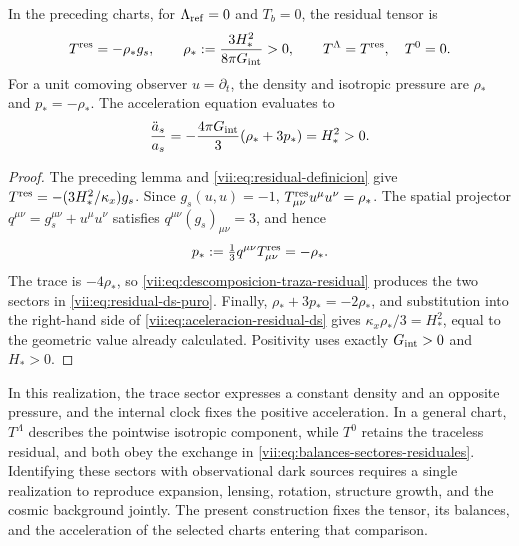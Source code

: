 \begin{theorem}
\label{vii:thm:residual-ds-aceleracion}
In the preceding charts, for \(\Lambda_{\rm ref}=0\) and \(T_b=0\),
the residual tensor is
\begin{equation}
 T^{\rm res}=-\rho_*g_s,\qquad
 \rho_*:=\frac{3H_*^2}{8\pi G_{\rm int}}>0,
 \qquad T^\Lambda=T^{\rm res},\quad T^0=0.
 \label{vii:eq:residual-ds-puro}
\end{equation}
For a unit comoving observer \(u=\partial_t\), the density and
isotropic pressure are \(\rho_*\) and \(p_*=-\rho_*\).
The acceleration equation evaluates to
\begin{equation}
 \frac{\ddot a_s}{a_s}
 =-\frac{4\pi G_{\rm int}}3(\rho_*+3p_*)=H_*^2>0.
 \label{vii:eq:aceleracion-residual-ds}
\end{equation}
\end{theorem}
\begin{proof}
The preceding lemma and \eqref{vii:eq:residual-definicion} give
\(T^{\rm res}=-(3H_*^2/\kappa_x)g_s\).
Since \(g_s(u,u)=-1\),
\(T^{\rm res}_{\mu\nu}u^\mu u^\nu=\rho_*\).
The spatial projector \(q^{\mu\nu}=g_s^{\mu\nu}+u^\mu u^\nu\)
satisfies \(q^{\mu\nu}(g_s)_{\mu\nu}=3\), and hence
\[
 p_*:=\tfrac13q^{\mu\nu}T^{\rm res}_{\mu\nu}=-\rho_*.
\]
The trace is \(-4\rho_*\), so
\eqref{vii:eq:descomposicion-traza-residual} produces the two
sectors in \eqref{vii:eq:residual-ds-puro}. Finally,
\(\rho_*+3p_*=-2\rho_*\), and substitution into the right-hand
side of \eqref{vii:eq:aceleracion-residual-ds} gives
\(\kappa_x\rho_*/3=H_*^2\), equal to the geometric value
already calculated. Positivity uses exactly \(G_{\rm int}>0\)
and \(H_*>0\).
\end{proof}

In this realization, the trace sector expresses a constant density
and an opposite pressure, and the internal clock fixes the positive
acceleration. In a general chart, \(T^\Lambda\) describes the
pointwise isotropic component, while \(T^0\) retains the
traceless residual, and both obey the exchange in
\eqref{vii:eq:balances-sectores-residuales}. Identifying these
sectors with observational dark sources requires a single realization
to reproduce expansion, lensing, rotation, structure growth, and the
cosmic background jointly. The present construction fixes the tensor,
its balances, and the acceleration of the selected charts entering
that comparison.
